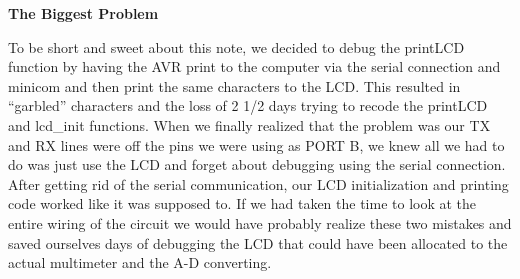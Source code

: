 \textbf{The Biggest Problem}

To be short and sweet about this note, we decided to debug the printLCD function by having the AVR print to the computer via the serial connection and minicom and then print the same characters to the LCD. This resulted in “garbled” characters and the loss of 2 1/2  days trying to recode the printLCD and lcd\_init functions. When we finally realized that the problem was our TX and RX lines were off the pins we were using as PORT B,  we knew all we had to do was just use the LCD and forget about debugging using the serial connection. After getting rid of the serial communication, our LCD initialization and printing code worked like it was supposed to. If we had taken the time to look at the entire wiring of the circuit we would have probably realize these two mistakes and saved ourselves days of debugging the LCD that could have been allocated to the actual multimeter and the A-D converting.